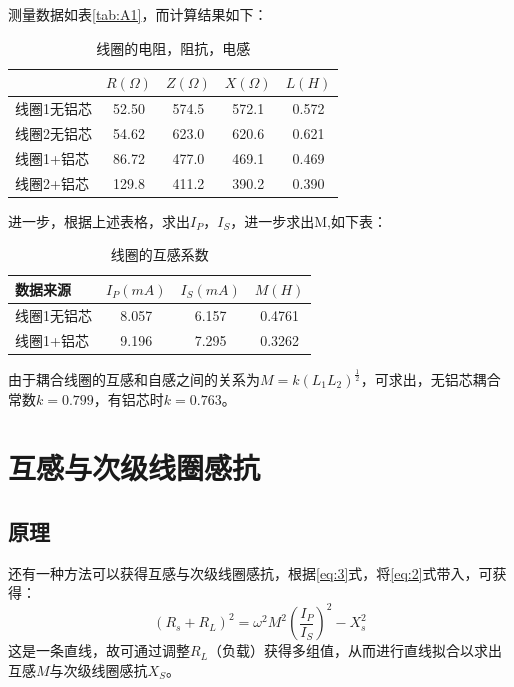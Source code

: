 \documentclass[12pt]{article}
\begin{document}
测量数据如表\ref{tab:A1}，而计算结果如下：
\begin{table}[H]
    \centering
    \begin{tabular}{|l|c|c|c|c|}
    \hline
           & $R(\Omega)$ & $Z(\Omega)$ & $X(\Omega)$ & $L(H)$ \\ \hline
    线圈1无铝芯 & 52.50       & 574.5       & 572.1       & 0.572  \\ \hline
    线圈2无铝芯 & 54.62       & 623.0       & 620.6       & 0.621  \\ \hline
    线圈1+铝芯 & 86.72       & 477.0       & 469.1       & 0.469  \\ \hline
    线圈2+铝芯 & 129.8       & 411.2       & 390.2       & 0.390  \\ \hline
    \end{tabular}
    \caption{线圈的电阻，阻抗，电感}
    \label{tab:1}
\end{table}
进一步，根据上述表格，求出$I_P$，$I_S$，进一步求出M,如下表：
\begin{table}[H]
    \centering
    \begin{tabular}{|l|c|c|c|}
    \hline
    数据来源   & $I_P(mA)$ & $I_S(mA)$ & $M(H)$ \\ \hline
    线圈1无铝芯 & 8.057     & 6.157     & 0.4761 \\ \hline
    线圈1+铝芯 & 9.196     & 7.295     & 0.3262 \\ \hline
    \end{tabular}
    \caption{线圈的互感系数}
    \label{tab:2}
\end{table}

由于耦合线圈的互感和自感之间的关系为$M=k(L_1L_2)^{\frac{1}{2}}$，可求出，无铝芯耦合常数$k=0.799$，有铝芯时$k=0.763$。

\section{互感与次级线圈感抗}

\subsection*{原理}
还有一种方法可以获得互感与次级线圈感抗，根据\ref{eq:3}式，将\ref{eq:2}式带入，可获得：
\begin{equation}
    (R_s+R_L)^2=\omega^2 M^2 (\frac{I_P}{I_S})^2 - X_s^2
    \label{eq:4}
\end{equation}
这是一条直线，故可通过调整$R_L$（负载）获得多组值，从而进行直线拟合以求出互感$M$与次级线圈感抗$X_S$。
\end{document}
